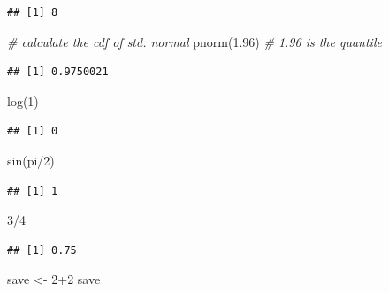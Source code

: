 \documentclass[
]{book}
\newenvironment{Shaded}{\begin{snugshade}}{\end{snugshade}}
\newcommand{\CommentTok}[1]{\textcolor[rgb]{0.56,0.35,0.01}{\textit{#1}}}
\newcommand{\DecValTok}[1]{\textcolor[rgb]{0.00,0.00,0.81}{#1}}
\newcommand{\FloatTok}[1]{\textcolor[rgb]{0.00,0.00,0.81}{#1}}
\newcommand{\FunctionTok}[1]{\textcolor[rgb]{0.00,0.00,0.00}{#1}}
\newcommand{\NormalTok}[1]{#1}
\newcommand{\OtherTok}[1]{\textcolor[rgb]{0.56,0.35,0.01}{#1}}
\newcommand{\SpecialCharTok}[1]{\textcolor[rgb]{0.00,0.00,0.00}{#1}}
\theoremstyle{definition}
\theoremstyle{definition}
\theoremstyle{definition}
\theoremstyle{definition}
\theoremstyle{remark}
\begin{document}
\begin{verbatim}
## [1] 8
\end{verbatim}

\begin{Shaded}
\begin{Highlighting}[]
\CommentTok{\# calculate the cdf of std. normal}
\FunctionTok{pnorm}\NormalTok{(}\FloatTok{1.96}\NormalTok{) }\CommentTok{\# 1.96 is the quantile}
\end{Highlighting}
\end{Shaded}

\begin{verbatim}
## [1] 0.9750021
\end{verbatim}

\begin{Shaded}
\begin{Highlighting}[]
\FunctionTok{log}\NormalTok{(}\DecValTok{1}\NormalTok{)}
\end{Highlighting}
\end{Shaded}

\begin{verbatim}
## [1] 0
\end{verbatim}

\begin{Shaded}
\begin{Highlighting}[]
\FunctionTok{sin}\NormalTok{(pi}\SpecialCharTok{/}\DecValTok{2}\NormalTok{)}
\end{Highlighting}
\end{Shaded}

\begin{verbatim}
## [1] 1
\end{verbatim}

\begin{Shaded}
\begin{Highlighting}[]
\DecValTok{3}\SpecialCharTok{/}\DecValTok{4}
\end{Highlighting}
\end{Shaded}

\begin{verbatim}
## [1] 0.75
\end{verbatim}

\begin{Shaded}
\begin{Highlighting}[]
\NormalTok{save }\OtherTok{\textless{}{-}} \DecValTok{2}\SpecialCharTok{+}\DecValTok{2}
\NormalTok{save}
\end{Highlighting}
\end{Shaded}
\end{document}
